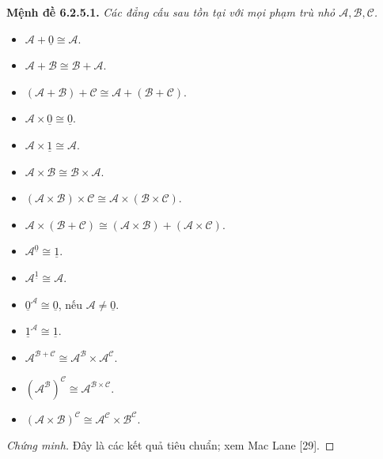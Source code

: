 \noindent\textbf{Mệnh đề 6.2.5.1.} \emph{Các đẳng cấu sau tồn tại với mọi phạm trù nhỏ $\mathcal A,\mathcal B,\mathcal C$.}
\begin{itemize}
\item $\mathcal A+\underline0\cong\mathcal A$.
\item $\mathcal A+\mathcal B\cong\mathcal B+\mathcal A$.
\item $(\mathcal A+\mathcal B)+\mathcal C\cong\mathcal A+(\mathcal B+\mathcal C)$.
\item $\mathcal A\times\underline0\cong\underline0$.
\item $\mathcal A\times\underline1\cong\mathcal A$.
\item $\mathcal A\times\mathcal B\cong\mathcal B\times\mathcal A$.
\item $(\mathcal A\times\mathcal B)\times\mathcal C\cong\mathcal A\times(\mathcal B\times\mathcal C)$.
\item $\mathcal A\times(\mathcal B+\mathcal C)\cong(\mathcal A\times\mathcal B)+(\mathcal A\times\mathcal C)$.
\item $\mathcal A^{\underline0}\cong\underline1$.
\item $\mathcal A^{\underline1}\cong\mathcal A$.
\item $\underline0^{\mathcal A}\cong\underline0$, nếu $\mathcal A\ne\underline0$.
\item $\underline1^{\mathcal A}\cong\underline1$.
\item $\mathcal A^{\mathcal B+\mathcal C}\cong\mathcal A^{\mathcal B}\times\mathcal A^{\mathcal C}$.
\item $(\mathcal A^{\mathcal B})^{\mathcal C}\cong\mathcal A^{\mathcal B\times\mathcal C}$.
\item $(\mathcal A\times\mathcal B)^{\mathcal C}\cong\mathcal A^{\mathcal C}\times\mathcal B^{\mathcal C}$.
\end{itemize}
\begin{proof}[Chứng minh]Đây là các kết quả tiêu chuẩn; xem Mac Lane [29].\end{proof}
